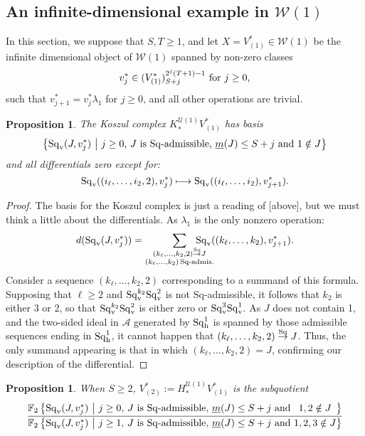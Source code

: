 \documentclass[11pt]{amsart}
\theoremstyle{plain}
\newtheorem{prop}[thm]{Proposition}
\theoremstyle{definition}
\newcommand{\calW}{\mathcal{W}}
\newcommand{\calU}{\mathcal{U}}
\newcommand{\calA}{\mathcal{A}}
\theoremstyle{plain}
\newcommand{\minDimSq}{\underline{m}}
\newcommand{\produces}[3]{#3:#1\sim #2}
\renewcommand{\produces}[3]{#1\rightarrow_{#3} #2}%
\renewcommand{\produces}[3]{#1\overset{\smash{#3}}{\rightarrow} #2}%
\newcommand{\Sq}{\mathrm{Sq}}
\newcommand{\Sqv}{\mathrm{Sq}_\textup{v}}
\newcommand{\LieSteen}{\calA}
\newcommand{\F}{\mathbb{F}}
\begin{document}
\begin{Calculations of HWn for n nonzero}
\subsection{An infinite-dimensional example in $\calW(1)$}
In this section, we suppose that $S,T\geq1$, and let $X=V^*_{(1)}\in\calW(1)$ be the infinite dimensional object of $\calW(1)$ spanned by non-zero classes
\[v_{j}^{*}\in (V^*_{(1)})^{2^{j}(T+1)-1}_{S+j}\textup{ for $j\geq 0$},\] such that $v_{j+1}^*=v^*_j\lambda_{1}$ for $j\geq 0$, and all other operations are trivial. %
\begin{prop}\label{calc of koszul complex in inf dim example}
The Koszul complex $K_*^{\calU(1)}V_{(1)}^*$ has basis
\[\left\{\Sq_{\textup{v}}(J,v_j^*)\ \middle|\ \textup{$j\geq0$, $J$ is $\Sq$-admissible, $\minDimSq(J)\leq S+j$ and $1\notin J$}\right\} \]
and all differentials zero except for:
\[\Sq_{\textup{v}}((i_\ell,\ldots,i_2,2),v^*_{j})\longmapsto \Sq_{\textup{v}}((i_\ell,\ldots,i_2),v^*_{j+1}).\]
\end{prop}
\begin{proof}
The basis for the Koszul complex is just a reading of [above], but we must think a little about the differentials. As $\lambda_1$ is the only nonzero operation:
\[d(\Sqv(J,v^*_j))=\sum_{ \substack{\produces{(k_{\ell},\ldots,k_2,2)}{J}{\Sq}\\(k_{\ell},\ldots,k_2){\,\Sq\textup{-admis.}}}}\!\!\!\!\!\!\!\!\!\!\!\! \Sqv((k_{\ell},\ldots,k_2),v_{j+1}^*).\]
Consider a sequence $(k_\ell,\ldots,k_2,2)$ corresponding to a summand of this formula. Supposing that $\ell\geq2$ and $\Sqv^{k_2}\Sqv^2$ is not $\Sq$-admissible, it follows that $k_2$ is either 3 or 2, so that $\Sqv^{k_2}\Sqv^2$ is either zero or $\Sqv^{3}\Sqv^1$. As $J$ does not contain 1, and the two-sided ideal in $\LieSteen$ generated by $\Sq^1_\textup{h}$ is spanned by those admissible sequences ending in $\Sq^1_\textup{h}$, it cannot happen that $\produces{(k_{\ell},\ldots,k_2,2)}{J}{\Sq}$. Thus, the only summand appearing is that in which $(k_{\ell},\ldots,k_2,2)=J$, confirming our description of the differential.
\end{proof}
\begin{prop}\label{Sg1 calc of V2}
When $S\geq2$, $V^*_{(2)}:=H_*^{\calU(1)}V_{(1)}^{*}$ is the subquotient
\[\frac{{\F_{2}\left\{\Sq_{\textup{v}}(J,v_j^*)\ \middle|\ \makebox[\widthof{$\textup{$j\geq0$}$}][c]{$\textup{$j\geq0$}$}\textup{, $J$ is $\Sq$-admissible, $\minDimSq(J)\leq S+j$ and}\makebox[\widthof{$\textup{ $1,2,3\notin J$}$}][c]{$\textup{ $1,2\notin J$}$}\right\}}}{{\F_{2}\left\{\Sq_{\textup{v}}(J,v_j^*)\ \middle|\ \makebox[\widthof{$\textup{$j\geq0$}$}][c]{$\textup{$j\geq1$}$}\textup{, $J$ is $\Sq$-admissible, $\minDimSq(J)\leq S+j$ and}\makebox[\widthof{$\textup{ $1,2,3\notin J$}$}][c]{$\textup{ $1,2,3\notin J$}$}\right\}}}\]

\end{prop}
\end{Calculations of HWn for n nonzero}
\end{document}
